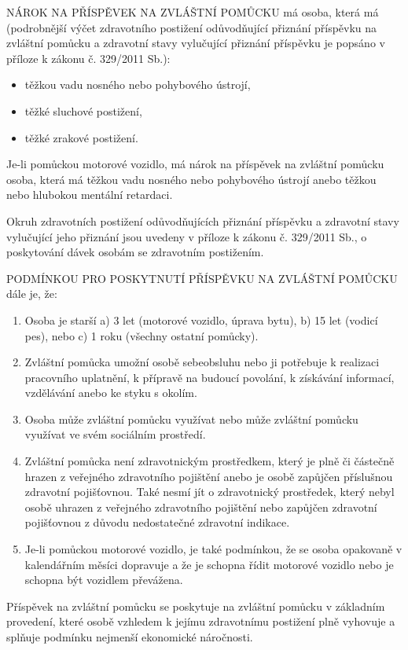 \documentclass[thesis=M,czech]{FITthesis}[2012/06/26]
\begin{document}
NÁROK NA PŘÍSPĚVEK NA ZVLÁŠTNÍ POMŮCKU má osoba, která má (podrobnější výčet
zdravotního postižení odůvodňující přiznání příspěvku na zvláštní pomůcku a
zdravotní stavy vylučující přiznání příspěvku je popsáno v příloze k zákonu
č. 329/2011 Sb.):
\begin{itemize}
  \item těžkou vadu nosného nebo pohybového ústrojí,
  \item těžké sluchové postižení,
  \item těžké zrakové postižení.
\end{itemize}
Je-li pomůckou motorové vozidlo, má nárok na příspěvek na zvláštní pomůcku
osoba, která má těžkou vadu nosného nebo pohybového ústrojí anebo těžkou
nebo hlubokou mentální retardaci.

Okruh zdravotních postižení odůvodňujících přiznání příspěvku a zdravotní
stavy vylučující jeho přiznání jsou uvedeny v příloze k zákonu č. 329/2011
Sb., o poskytování dávek osobám se zdravotním postižením.

PODMÍNKOU PRO POSKYTNUTÍ PŘÍSPĚVKU NA ZVLÁŠTNÍ POMŮCKU dále je, že:
\begin{enumerate}
    \item Osoba je starší
        a) 3 let (motorové vozidlo, úprava bytu),
        b) 15 let (vodicí pes), nebo
        c) 1 roku (všechny ostatní pomůcky).
   
    \item Zvláštní pomůcka umožní osobě sebeobsluhu nebo ji potřebuje k
realizaci pracovního uplatnění, k přípravě na budoucí povolání, k získávání
informací, vzdělávání anebo ke styku s okolím.
    \item Osoba může zvláštní pomůcku využívat nebo může zvláštní pomůcku
využívat ve svém sociálním prostředí.
    \item Zvláštní pomůcka není zdravotnickým prostředkem, který je plně či
částečně hrazen z veřejného zdravotního pojištění anebo je osobě zapůjčen
příslušnou zdravotní pojišťovnou. Také nesmí jít o         zdravotnický
prostředek, který nebyl osobě uhrazen z veřejného zdravotního pojištění nebo
zapůjčen zdravotní pojišťovnou z důvodu nedostatečné zdravotní indikace.
    \item Je-li pomůckou motorové vozidlo, je také podmínkou, že se osoba
opakovaně v kalendářním měsíci dopravuje a že je schopna řídit motorové
vozidlo nebo je schopna být vozidlem převážena.
\end{enumerate}

Příspěvek na zvláštní pomůcku se poskytuje na zvláštní pomůcku v základním
provedení, které osobě vzhledem k jejímu zdravotnímu postižení plně vyhovuje
a splňuje podmínku nejmenší ekonomické náročnosti.
\end{document}
